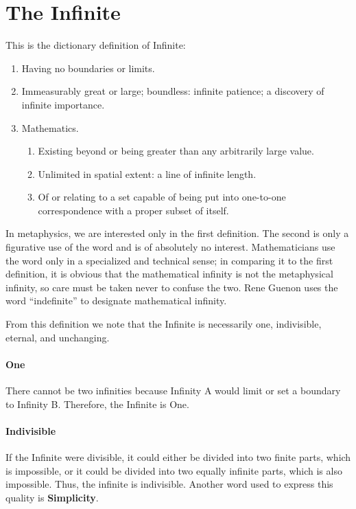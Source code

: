 \section{The Infinite}

This is the dictionary definition of Infinite:

\begin{enumerate}
\item Having no boundaries or limits. 
\item Immeasurably great or large; boundless: infinite patience; a discovery of infinite importance. 
\item Mathematics. 

\begin{enumerate}
\item Existing beyond or being greater than any arbitrarily large value. 
\item Unlimited in spatial extent: a line of infinite length. 
\item Of or relating to a set capable of being put into one-to-one correspondence with a proper subset of itself. 
\end{enumerate}
\end{enumerate}
In metaphysics, we are interested only in the first definition. The second is only a figurative use of the word and is of absolutely no interest. Mathematicians use the word only in a specialized and technical sense; in comparing it to the first definition, it is obvious that the mathematical infinity is not the metaphysical infinity, so care must be taken never to confuse the two. Rene Guenon uses the word “indefinite” to designate mathematical infinity.

From this definition we note that the Infinite is necessarily one, indivisible, eternal, and unchanging.

\paragraph{One}
There cannot be two infinities because Infinity A would limit or set a boundary to Infinity B. Therefore, the Infinite is One.

\paragraph{Indivisible}
If the Infinite were divisible, it could either be divided into two finite parts, which is impossible, or it could be divided into two equally infinite parts, which is also impossible. Thus, the infinite is indivisible. Another word used to express this quality is \textbf{Simplicity}.

